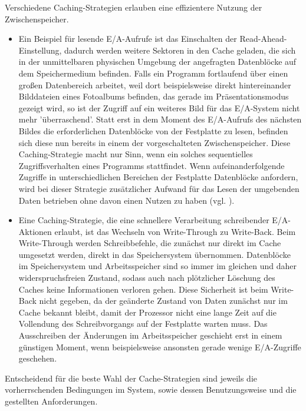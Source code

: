 \documentclass[
	12pt,
	a4paper,
	BCOR10mm,
	DIV14,
	listof=totoc,
	bibliography=totoc,
	headsepline
]{scrreprt}
\begin{document}
Verschiedene Caching-Strategien erlauben eine effizientere Nutzung der Zwischenspeicher.
\begin{itemize}
\item Ein Beispiel für lesende E/A-Aufrufe ist das Einschalten der Read-Ahead-Einstellung, dadurch werden weitere Sektoren in den Cache geladen, die sich in der unmittelbaren physischen Umgebung der angefragten Datenblöcke auf dem  Speichermedium befinden. Falls ein Programm fortlaufend über einen großen Datenbereich arbeitet, weil dort beispielsweise direkt hintereinander Bilddateien eines Fotoalbums befinden, das gerade im Präsentationsmodus gezeigt wird, so ist der Zugriff auf ein weiteres Bild für das E/A-System nicht mehr 'überraschend'. Statt erst in dem Moment des E/A-Aufrufs des nächsten Bildes die erforderlichen Datenblöcke von der Festplatte zu lesen, befinden sich diese nun bereits in einem der vorgeschalteten Zwischenspeicher. Diese Caching-Strategie macht nur Sinn, wenn ein solches sequentielles Zugriffsverhalten eines Programms stattfindet. 
Wenn aufeinanderfolgende Zugriffe in unterschiedlichen Bereichen der Festplatte Datenblöcke anfordern, wird bei dieser Strategie zusätzlicher Aufwand für das Lesen der umgebenden Daten betrieben ohne davon einen Nutzen zu haben (vgl. \cite{corbet2015}). 
\item Eine Caching-Strategie, die eine schnellere Verarbeitung schreibender E/A-Aktionen erlaubt, ist das Wechseln von Write-Through zu Write-Back. Beim Write-Through werden Schreibbefehle, die zunächst nur direkt im Cache umgesetzt werden, direkt in das Speichersystem übernommen. Datenblöcke im Speichersystem und Arbeitsspeicher sind so immer im gleichen und daher widerspruchsfreien Zustand, sodass auch nach plötzlicher Löschung des Caches keine Informationen verloren gehen.
Diese Sicherheit ist beim Write-Back nicht gegeben, da der geänderte Zustand von Daten zunächst nur im Cache bekannt bleibt, damit der Prozessor nicht eine lange Zeit auf die Vollendung des Schreibvorgangs auf der Festplatte warten muss. Das Ausschreiben der Änderungen im Arbeitsspeicher geschieht erst in einem günstigen Moment, wenn beispielsweise ansonsten gerade wenige E/A-Zugriffe geschehen.
\end{itemize}
Entscheidend für die beste Wahl der Cache-Strategien sind jeweils die vorherrschenden Bedingungen im System, sowie dessen Benutzungsweise und die gestellten Anforderungen.
\end{document}

